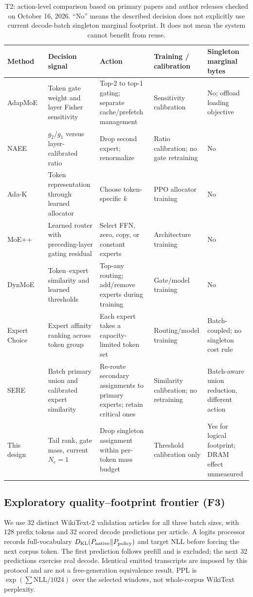 \documentclass[10pt,twocolumn]{article}
\begin{document}
\begin{table}[t]\centering\footnotesize
\caption{T2: action-level comparison based on primary papers and author releases checked on October 16, 2026. ``No'' means the described decision does not explicitly use current decode-batch singleton marginal footprint. It does not mean the system cannot benefit from reuse.}\label{tab:related}
\begin{tabularx}{\textwidth}{L{0.12\textwidth} L{0.24\textwidth} L{0.24\textwidth} L{0.14\textwidth} Y}\toprule
Method & Decision signal & Action & Training / calibration & Singleton marginal bytes\\\midrule
AdapMoE~\cite{adapmoe} & Token gate weight and layer Fisher sensitivity & Top-2 to top-1 gating; separate cache/prefetch management & Sensitivity calibration & No; offload loading objective\\
NAEE~\cite{naee} & $g_2/g_1$ versus layer-calibrated ratio & Drop second expert; renormalize & Ratio calibration; no gate retraining & No\\
Ada-K~\cite{adak} & Token representation through learned allocator & Choose token-specific $k$ & PPO allocator training & No\\
MoE++~\cite{moepp} & Learned router with preceding-layer gating residual & Select FFN, zero, copy, or constant experts & Architecture training & No\\
DynMoE~\cite{dynmoe} & Token--expert similarity and learned thresholds & Top-any routing; add/remove experts during training & Gate/model training & No\\
Expert Choice~\cite{expertchoice} & Expert affinity ranking across token group & Each expert takes a capacity-limited token set & Routing/model training & Batch-coupled; no singleton cost rule\\
SERE~\cite{sere} & Batch primary union and calibrated expert similarity & Re-route secondary assignments to primary experts; retain critical ones & Similarity calibration; no retraining & Batch-aware union reduction, different action\\
This design & Tail rank, gate mass, current $N_e=1$ & Drop singleton assignment within per-token mass budget & Threshold calibration only & Yes for logical footprint; DRAM effect unmeasured\\\bottomrule
\end{tabularx}\end{table}

\subsection{Exploratory quality--footprint frontier (F3)}
We use 32 distinct WikiText-2 validation articles for all three batch sizes, with 128 prefix tokens and 32 scored decode predictions per article. A logits processor records full-vocabulary $D_{\rm KL}(P_{\rm native}\Vert P_{\rm policy})$ and target NLL before forcing the next corpus token. The first prediction follows prefill and is excluded; the next 32 predictions exercise real decode. Identical emitted transcripts are imposed by this protocol and are not a free-generation equivalence result. PPL is $\exp(\sum\mathrm{NLL}/1024)$ over the selected windows, not whole-corpus WikiText perplexity.
\end{document}
